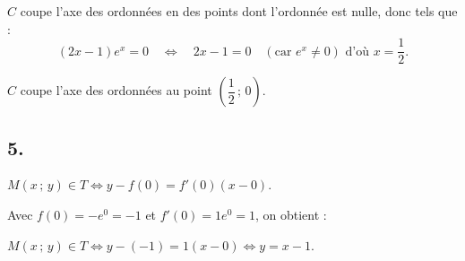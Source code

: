 \documentclass[10pt]{article}
\begin{document}
\(C\) coupe l'axe des ordonnées en des points dont l'ordonnée est nulle, donc tels que :
\[
(2x - 1) e^x = 0 \quad \Longleftrightarrow \quad 2x - 1 = 0 \quad (\text{car } e^x \neq 0) \text{ d'où } x = \dfrac{1}{2}.
\]

\(C\) coupe l'axe des ordonnées au point \(\left(\dfrac{1}{2}\,;\,0\right)\).

\subsection*{5.}

\(M(x\,;\,y) \in T \Longleftrightarrow y - f(0) = f'(0)(x - 0).\)

Avec \(f(0) = -e^0 = -1\) et \(f'(0) = 1e^0 = 1\), on obtient :

\(M(x\,;\,y) \in T \Longleftrightarrow y - (-1) = 1(x - 0) \Longleftrightarrow y = x - 1.\)
\end{document}
